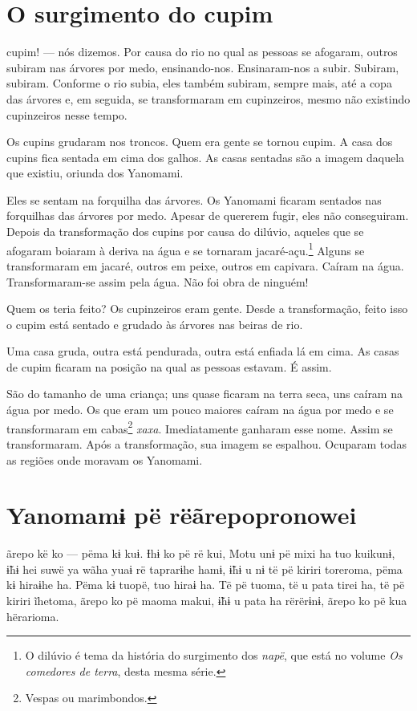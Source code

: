 \chapter{O surgimento do cupim}

 cupim! --- nós dizemos. 
Por causa do rio no qual as pessoas se afogaram, outros subiram nas
árvores por medo, ensinando-nos. Ensinaram-nos a subir. Subiram,
subiram. Conforme o rio subia, eles também subiram, sempre mais, até a
copa das árvores e, em seguida, se transformaram em cupinzeiros, mesmo
não existindo cupinzeiros nesse tempo. 

Os cupins grudaram nos troncos. Quem era gente se tornou cupim. A casa
dos cupins fica sentada em cima dos galhos. As casas sentadas são a
imagem daquela que existiu, oriunda dos Yanomami. 

Eles se sentam na forquilha das árvores. Os Yanomami ficaram sentados
nas forquilhas das árvores por medo. Apesar de quererem fugir, eles não
conseguiram. Depois da transformação dos cupins por causa do dilúvio,
aqueles que se afogaram boiaram à deriva na água e se tornaram
jacaré-açu.\footnote{O dilúvio é tema da história do surgimento dos \textit{napë}, que está no volume \textit{Os comedores de terra}, desta mesma série.} Alguns se transformaram em jacaré, outros em peixe, outros em capivara. Caíram na água. Transformaram-se
assim pela água. Não foi obra de ninguém! 

Quem os teria feito? Os cupinzeiros eram gente. Desde a
transformação, feito isso o cupim está sentado e grudado às árvores nas
beiras de rio.

Uma casa gruda, outra está pendurada, outra está enfiada lá em cima. As
casas de cupim ficaram na posição na qual as pessoas estavam.
É assim. 

São do tamanho de uma criança; uns quase ficaram na terra seca, uns
caíram na água por medo. Os que eram um pouco maiores caíram na água por
medo e se transformaram em cabas\footnote{Vespas ou marimbondos.} \textit{xaxa}. Imediatamente ganharam esse nome. Assim se transformaram. Após a transformação,
sua imagem se espalhou. Ocuparam todas as regiões onde moravam os
Yanomami. 

\chapter[Yanomamɨ pë rë ãrepopronowei]{Yanomamɨ pë rë\break ãrepopronowei}

 ãrepo kë ko --- pëma kɨ kuɨ. Ɨhɨ ko pë rë kui, Motu unɨ pë mixi ha tuo kuikunɨ, ɨ̃hɨ hei suwë ya wãha
yuaɨ rë taprarɨhe hamɨ, ɨ̃hɨ u nɨ të pë kiriri toreroma, pëma kɨ hiraɨhe
ha. Pëma kɨ tuopë, tuo hiraɨ ha. Të pë tuoma, të u pata tirei ha, të pë
kiriri ĩhetoma, ãrepo ko pë maoma makui, ɨ̃hɨ u pata ha rërërɨnɨ, ãrepo
ko pë kua hërarioma. 

